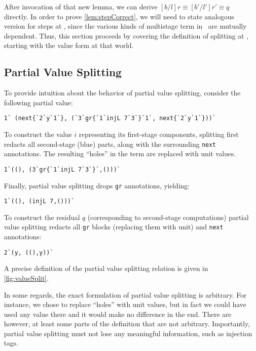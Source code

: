 \begin{abstrsyn}
After invocation of that new lemma, we can derive $[b/l]r \equiv [b'/l']r' \equiv q$ directly.
In order to prove \ref{lem:stepCorrect},
we will need to state analogous version for steps at \bbonem,
since the various kinds of multistage term in \lang\ are mutually dependent.
Thus, this section proceeds by covering the definition of splitting at \bbonem, 
starting with the value form at that world.

\subsection{Partial Value Splitting}
\label{sec:masking}

To provide intuition about the behavior of partial value splitting, consider the
following partial value:
\begin{lstlisting}
1` (next{`2`y`1`}, (`3`gr{`1`injL 7`3`}`1`, next{`2`y`1`}))`
\end{lstlisting}
To construct the value $i$ representing its first-stage components,
splitting first redacts all second-stage (blue) parts, along with the
surrounding \texttt{next} annotations. 
The resulting ``holes'' in the term are replaced with
unit values.
\begin{lstlisting}
1`((), (3`gr{`1`injL 7`3`}`,()))`
\end{lstlisting}
Finally, partial value splitting drops \texttt{gr} annotations, yielding:
\begin{lstlisting}
1`((), (injL 7,()))`
\end{lstlisting}
To construct the residual $q$ (corresponding to second-stage computations) partial value splitting redacts all \texttt{gr} blocks
(replacing them with unit) and \texttt{next} annotations:
\begin{lstlisting}
2`(y, ((),y))`
\end{lstlisting}
A precise definition of the partial value splitting relation is given in
\ref{fig:valueSplit}.

In some regards, the exact formulation of partial value splitting is arbitrary.
For instance, we chose to replace ``holes'' with unit values,
but in fact we could have used any value there and it would make no difference in the end.
There are however, at least some parts of the definition that are not arbitrary.
Importantly, partial value splitting must not lose any meaningful information,
such as injection tags.


\end{abstrsyn}
